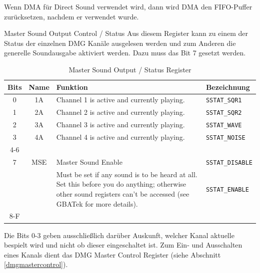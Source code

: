 \documentclass[11pt,a4paper]{scrartcl}
\begin{document}
Wenn DMA f\"ur Direct Sound verwendet wird, dann wird DMA den FIFO-Puffer zur\"ucksetzen, nachdem er verwendet wurde.






	
\newpage
	
\vspace{5mm}
\large Master Sound Output Control / Status \label{mastersoundoutputcontrol}
\vspace{2mm}\newline
Aus diesem Register kann zu einem der Status der einzelnen DMG Kan\"ale ausgelesen werden und zum Anderen die generelle Soundausgabe aktiviert werden. Dazu muss das Bit 7 gesetzt werden.

\begin{table}[h]
	\centering
    \begin{tabular}{ c | c | p{10cm} | l } 
	    \textbf{Bits} & \textbf{Name} & \textbf{Funktion} & \textbf{Bezeichnung} \\
	    \hline
	    0 & 1A & Channel 1 is active and currently playing. & \verb|SSTAT_SQR1| \\
	    \hline
	    1 & 2A & Channel 2 is active and currently playing. & \verb|SSTAT_SQR2| \\
	    \hline
	    2 & 3A & Channel 3 is active and currently playing. & \verb|SSTAT_WAVE| \\
	    \hline
	    3 & 4A & Channel 4 is active and currently playing. & \verb|SSTAT_NOISE| \\
	    \hline
	    4-6 & & & \\
	    \hline
	    7 & MSE & Master Sound Enable & \verb|SSTAT_DISABLE| \\
	      &     & Must be set if any sound is to be heard at all. Set this before you do anything; otherwise other sound registers can't be accessed (see GBATek for more details). & \verb|SSTAT_ENABLE| \\
	    \hline
	    8-F & & & \\
	\end{tabular}
	\caption{Master Sound Output / Status Register}
	\label{table:MasterSoundOutputControlStatusRegister}
\end{table}

Die Bits 0-3 geben ausschlie{\ss}lich dar\"uber Auskunft, welcher Kanal aktuelle bespielt wird und nicht ob dieser eingeschaltet ist. Zum Ein- und Ausschalten eines Kanals dient das DMG Master Control Register (siehe Abschnitt \ref{dmgmastercontrol}).
\end{document}
